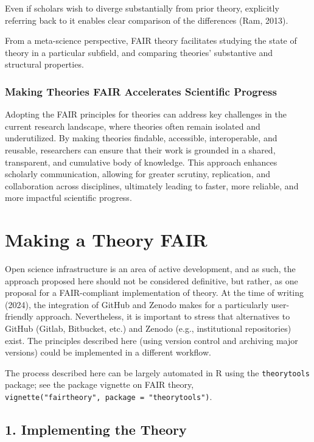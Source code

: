 \documentclass[
  man,floatsintext]{apa6}
\begin{document}
Even if scholars wish to diverge substantially from prior theory,
explicitly referring back to it enables clear comparison of the differences (Ram, 2013).

From a meta-science perspective, FAIR theory facilitates studying the state of theory in a particular subfield, and comparing theories' substantive and structural properties.

\subsubsection{Making Theories FAIR Accelerates Scientific Progress}\label{making-theories-fair-accelerates-scientific-progress}

Adopting the FAIR principles for theories can address key challenges in the current research landscape, where theories often remain isolated and underutilized. By making theories findable, accessible, interoperable, and reusable, researchers can ensure that their work is grounded in a shared, transparent, and cumulative body of knowledge. This approach enhances scholarly communication, allowing for greater scrutiny, replication, and collaboration across disciplines, ultimately leading to faster, more reliable, and more impactful scientific progress.

\section{Making a Theory FAIR}\label{making-a-theory-fair}

Open science infrastructure is an area of active development, and as such,
the approach proposed here should not be considered definitive,
but rather, as one proposal for a FAIR-compliant implementation of theory.
At the time of writing (2024), the integration of GitHub and Zenodo makes for a particularly user-friendly approach.
Nevertheless, it is important to stress that alternatives to GitHub (Gitlab, Bitbucket, etc.) and Zenodo (e.g., institutional repositories) exist.
The principles described here
(using version control and archiving major versions) could be implemented in a different workflow.

The process described here can be largely automated in R using the \texttt{theorytools} package; see the package vignette on FAIR theory, \texttt{vignette("fairtheory",\ package\ =\ "theorytools")}.

\subsection{1. Implementing the Theory}\label{implementing-the-theory}
\end{document}
